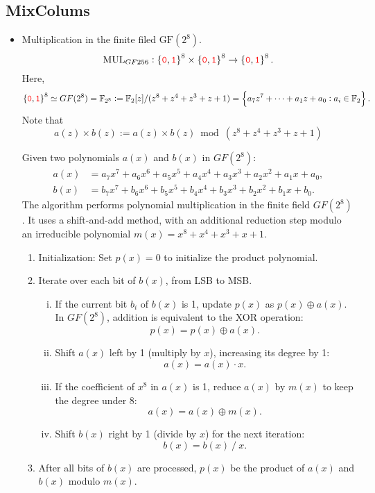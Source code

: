 \newpage
\subsection{MixColums}
\begin{itemize}
	\item Multiplication in the finite filed $\text{GF}(2^8)$. \[
	\text{MUL}_{GF256}:\set{\textcolor{red}{\texttt{0}},\textcolor{red}{\texttt{1}}}^{8}\times\set{\textcolor{red}{\texttt{0}},\textcolor{red}{\texttt{1}}}^8\to\set{\textcolor{red}{\texttt{0}},\textcolor{red}{\texttt{1}}}^8.
	\] Here, \[
	\set{\textcolor{red}{\texttt{0}},\textcolor{red}{\texttt{1}}}^{8}\simeq GF(2^8)=\mathbb{F}_{2^8}:=\mathbb{F}_2[z]/(z^8+z^4+z^3+z+1)=\set{a_7z^7+\cdots+a_1z+a_0:a_i\in\mathbb{F}_2}.
	\]
	Note that \[
	a(z)\times b(z):= a(z)\times b(z) \bmod (z^8+z^4+z^3+z+1)
	\]
	\vspace{12pt}
	\begin{note}
		Given two polynomials \( a(x) \) and \( b(x) \) in \( GF(2^8) \):
		\begin{align*}
			a(x) &= a_7x^7 + a_6x^6 + a_5x^5 + a_4x^4 + a_3x^3 + a_2x^2 + a_1x + a_0, \\
			b(x) &= b_7x^7 + b_6x^6 + b_5x^5 + b_4x^4 + b_3x^3 + b_2x^2 + b_1x + b_0.
		\end{align*}
		The algorithm performs polynomial multiplication in the finite field \( GF(2^8) \). It uses a shift-and-add method, with an additional reduction step modulo an irreducible polynomial \( m(x) = x^8 + x^4 + x^3 + x + 1 \).
		\begin{enumerate}
			\item Initialization: Set \( p(x) = 0 \) to initialize the product polynomial.
			\item Iterate over each bit of \( b(x) \), from LSB to MSB.
			\begin{enumerate}[(i)]
				\item If the current bit \( b_i \) of \( b(x) \) is 1, update \( p(x) \) as \( p(x) \oplus a(x) \). In \( GF(2^8) \), addition is equivalent to the XOR operation: \[
				p(x)=p(x)\oplus a(x).
				\]
				\item Shift \( a(x) \) left by 1 (multiply by \( x \)), increasing its degree by 1: \[
				a(x) = a(x)\cdot x.
				\]
				\item If the coefficient of \( x^8 \) in \( a(x) \) is 1, reduce \( a(x) \) by \( m(x) \) to keep the degree under 8: \[
				a(x)=a(x)\oplus m(x).
				\]
				\item Shift \( b(x) \) right by 1 (divide by \( x \)) for the next iteration: \[
				b(x) = b(x)\ /\ x.
				\] 
			\end{enumerate}
			\item After all bits of \( b(x) \) are processed, \( p(x) \) be the product of \( a(x) \) and \( b(x) \) modulo \( m(x) \).
		\end{enumerate}
	\end{note}


\end{itemize}
